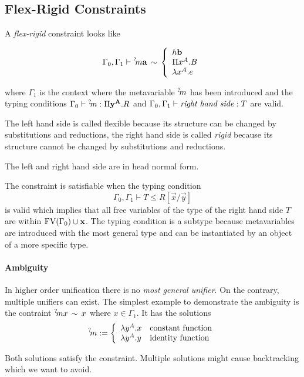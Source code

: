 \subsection{Flex-Rigid Constraints}

A \emph{flex-rigid} constraint looks like

$$
%
    \Gamma_0, \Gamma_1
%
    \vdash
%
    \meta m \vec a
%
    \equiv
%
    \cases {
        h \vec b
        \\
        \Pi x^A. B
        \\
        \lambda x^A. e
    }
$$

where $\Gamma_1$ is the context where the metavariable ${{}^? \kern-0.2em m}$ has been
introduced and the typing conditions
$\Gamma_0 \vdash {{}^? \kern-0.2em m} : \Pi {\mathbf y}^{{\mathbf A}}. R$
and
$\Gamma_0, \Gamma_1 \vdash \text{\emph{right hand side}}: T$
are valid.

The left hand side is called flexible because its structure can be changed by
substitutions and reductions, the right hand side is called \emph{rigid} because
its structure cannot be changed by substitutions and reductions.

The left and right hand side are in head normal form.


The constraint is satisfiable when the typing condition
$$
    \Gamma_0, \Gamma_1 \vdash T \le R[\vec x / \vec y]
$$
is valid which implies that all free variables of the type of the right hand side
$T$ are within ${\text{FV}}(\Gamma_0) \cup {\mathbf x}$. The typing condition is a subtype
because metavariables are introduced with the most general type and can be
instantiated by an object of a more specific type.



\paragraph{Ambiguity}
In higher order unification there is no \emph{most general unifier}. On the
contrary, multiple unifiers can exist. The simplest example to demonstrate the
ambiguity is the contraint ${{}^? \kern-0.2em m} x \,\sim\, x$ where $x \in \Gamma_1$. It has
the solutions
$$
    {{}^? \kern-0.2em m} := \left\{ \begin{array}{lllll} 
        \lambda y^A. x & \text{constant function}
        \\
        \lambda y^A. y & \text{identity function}
     \end{array} \right.
$$

Both solutions satisfy the constraint. Multiple solutions might cause
backtracking which we want to avoid.




